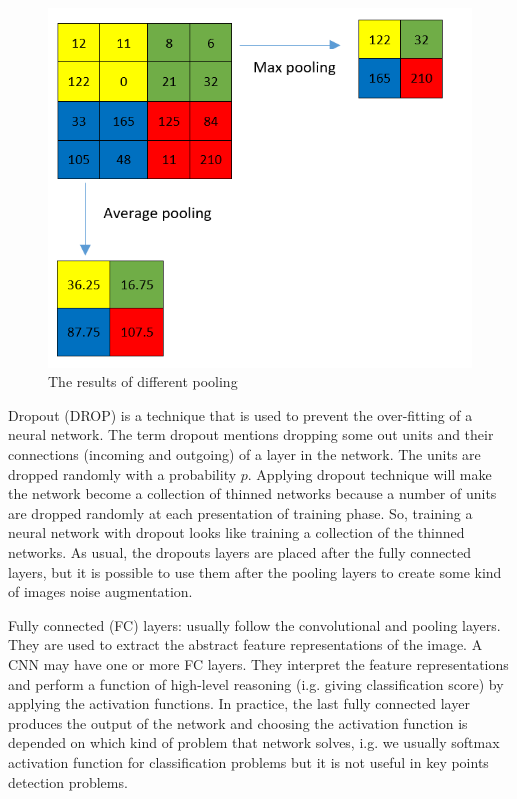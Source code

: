 \documentclass[review]{elsarticle}
\begin{document}

\begin{figure}[!h]
	\centering
	\includegraphics[scale=.5]{images/pooling}
	\caption{The results of different pooling}
	\label{imgcnn_pooling}
\end{figure}

Dropout (DROP) \cite{srivastava2014dropout} is a technique that is used to prevent the over-fitting of a neural network. The term dropout mentions dropping some out units and their connections (incoming and outgoing) of a layer in the network. The units are dropped randomly with a probability $p$. Applying dropout technique will make the network become a collection of thinned networks \cite{srivastava2014dropout} because a number of units are dropped randomly at each presentation of training phase. So, training a neural network with dropout looks like training a collection of the thinned networks. As usual, the dropouts layers are placed after the fully connected layers, but it is possible to use them after the pooling layers to create some kind of images noise augmentation.

Fully connected (FC) layers: usually follow the convolutional and pooling layers. They are used to extract the abstract feature representations of the image. A CNN may have one or more FC layers. They interpret the feature representations and perform a function of high-level reasoning (i.g. giving classification score) by applying the activation functions. In practice, the last fully connected layer produces the output of the network and choosing the activation function is depended on which kind of problem that network solves, i.g. we usually softmax activation function for classification problems but it is not useful in key points detection problems.
\end{document}
